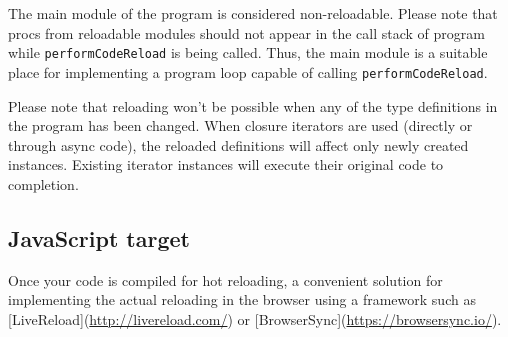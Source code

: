 The main module of the program is considered non-reloadable. Please note
that procs from reloadable modules should not appear in the call stack
of program while \texttt{performCodeReload} is being called. Thus, the
main module is a suitable place for implementing a program loop capable
of calling \texttt{performCodeReload}.

Please note that reloading won't be possible when any of the type
definitions in the program has been changed. When closure iterators are
used (directly or through async code), the reloaded definitions will
affect only newly created instances. Existing iterator instances will
execute their original code to completion.

\hypertarget{javascript-target}{%
\subsection{JavaScript target}\label{javascript-target}}

Once your code is compiled for hot reloading, a convenient solution for
implementing the actual reloading in the browser using a framework such
as {[}LiveReload{]}(\url{http://livereload.com/}) or
{[}BrowserSync{]}(\url{https://browsersync.io/}).
